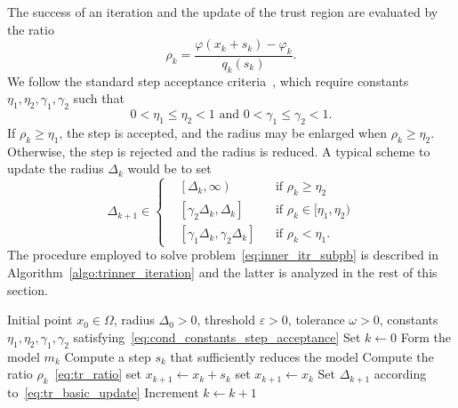 \documentclass[pdflatex,sn-mathphys-num]{sn-jnl}%
\theoremstyle{thmstyleone}%
\begin{document}
The success of an iteration and the update of the trust region are evaluated by the ratio
\begin{equation}\label{eq:tr_ratio}
	\rho_k = \dfrac{\varphi(x_k+s_k)-\varphi_k}{q_k(s_k)}.
\end{equation}
We follow the standard step acceptance criteria~\cite{conn-etal:2000}, which require constants $\eta_1, \eta_2, \gamma_1, \gamma_2$ such that 
\begin{equation}\label{eq:cond_constants_step_acceptance}
	0< \eta_1 \le \eta_2 < 1 \text{ and } 0< \gamma_1 \le \gamma_2 < 1.
\end{equation}
If $\rho_k \ge \eta_1$, the step is accepted, and the radius may be enlarged when $\rho_k \ge \eta_2$. Otherwise, the step is rejected and the radius is reduced. A typical scheme to update the radius $\Delta_k$ would be to set
\begin{equation}\label{eq:tr_basic_update}
	\Delta_{k+1} \in \left\{\begin{aligned}
		& \left[\Delta_k,\infty\right) & &\text{if } \rho_k \ge \eta_2 \\
		& \left[\gamma_2\Delta_k, \Delta_k\right]  & &\text{if } \rho_k \in [\eta_1,\eta_2) \\
		& \left[\gamma_1\Delta_k, \gamma_2\Delta_k\right]  & &\text{if }  \rho_k<\eta_1.
	\end{aligned}\right.
\end{equation}
The procedure employed to solve problem~\eqref{eq:inner_itr_subpb} is described in Algorithm~\ref{algo:trinner_iteration} and the latter is analyzed in the rest of this section. 
\begin{algorithm}
	\caption{Trust-region inner iteration algorithm}
	\label{algo:trinner_iteration}
	\begin{algorithmic}[1]
		\Require Initial point $x_0 \in \Omega$, radius $\Delta_0 >0$, threshold $\varepsilon > 0$, tolerance $\omega > 0$, constants $\eta_1, \eta_2, \gamma_1, \gamma_2$ satisfying~\eqref{eq:cond_constants_step_acceptance}
		\State Set $k \gets 0$ 
		\Repeat{}
		\State Form the model $m_k$
		\State Compute a step $s_k$ that sufficiently reduces the model
		\State Compute the ratio $\rho_k$~\eqref{eq:tr_ratio}
		 set $x_{k+1}\gets x_k+s_k$ 
		\Else{} set $x_{k+1} \gets x_k$ \EndIf
		\State Set $\Delta_{k+1}$ according to~\eqref{eq:tr_basic_update}
		\State Increment $k\gets k+1$
	\end{algorithmic}
\end{algorithm}
\end{document}
